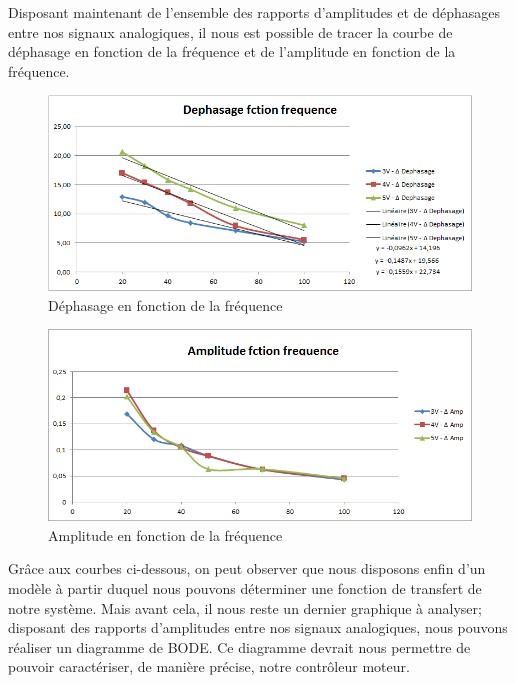 \documentclass[french,a4paper,12pt]{report}
\begin{document}
	Disposant maintenant de l'ensemble des rapports d'amplitudes et de déphasages entre nos signaux analogiques, il nous est possible de tracer la courbe de déphasage en fonction de la fréquence et de l'amplitude en fonction de la fréquence.
	 	
		\begin{figure}[!ht]
    \center
  	\includegraphics[width=15cm]{dFctionFreq.png}
    \caption{Déphasage en fonction de la fréquence}
	\end{figure}	
	
	\begin{figure}[!ht]
    \center
  	\includegraphics[width=15cm]{AFctionFreq.png}
    \caption{Amplitude en fonction de la fréquence}
	\end{figure}
	
	Grâce aux courbes ci-dessous, on peut observer que nous disposons enfin d'un modèle à partir duquel nous pouvons déterminer une fonction de transfert de notre système. Mais avant cela, il nous reste un dernier graphique à analyser; disposant des rapports d'amplitudes entre nos signaux analogiques, nous pouvons réaliser un diagramme de BODE. Ce diagramme devrait nous permettre de pouvoir caractériser, de manière précise, notre contrôleur moteur.
	
\end{document}
